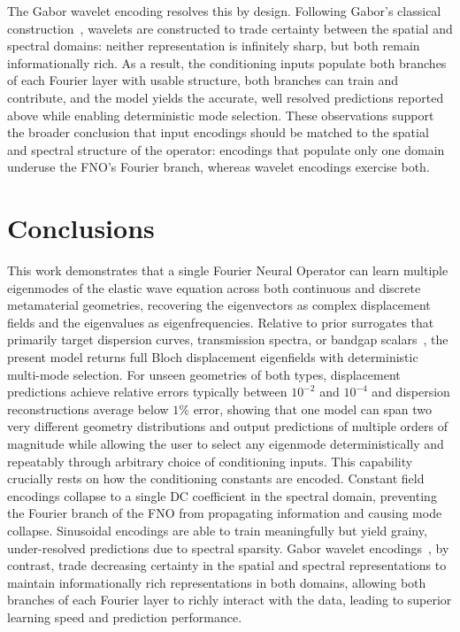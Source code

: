 \documentclass[preprint,review,12pt,numafflabel]{elsarticle}
\begin{document}
The Gabor wavelet encoding resolves this by design. Following Gabor's classical construction~\cite{gabor1946theory}, wavelets are constructed to trade certainty between the spatial and spectral domains: neither representation is infinitely sharp, but both remain informationally rich. As a result, the conditioning inputs populate both branches of each Fourier layer with usable structure, both branches can train and contribute, and the model yields the accurate, well resolved predictions reported above while enabling deterministic mode selection. These observations support the broader conclusion that input encodings should be matched to the spatial and spectral structure of the operator: encodings that populate only one domain underuse the FNO's Fourier branch, whereas wavelet encodings exercise both.


\section{Conclusions}
\label{sec:Conclusion}
This work demonstrates that a single Fourier Neural Operator can learn multiple eigenmodes of the elastic wave equation across both continuous and discrete metamaterial geometries, recovering the eigenvectors as complex displacement fields and the eigenvalues as eigenfrequencies. Relative to prior surrogates that primarily target dispersion curves, transmission spectra, or bandgap scalars~\cite{Ogren2024gpr,wagner2024neural,liu2026hybridfno}, the present model returns full Bloch displacement eigenfields with deterministic multi-mode selection. For unseen geometries of both types, displacement predictions achieve relative errors typically between $10^{-2}$ and $10^{-4}$ and dispersion reconstructions average below $1\%$ error, showing that one model can span two very different geometry distributions and output predictions of multiple orders of magnitude while allowing the user to select any eigenmode deterministically and repeatably through arbitrary choice of conditioning inputs. This capability crucially rests on how the conditioning constants are encoded. Constant field encodings collapse to a single DC coefficient in the spectral domain, preventing the Fourier branch of the FNO from propagating information and causing mode collapse. Sinusoidal encodings are able to train meaningfully but yield grainy, under-resolved predictions due to spectral sparsity. Gabor wavelet encodings~\cite{gabor1946theory}, by contrast, trade decreasing certainty in the spatial and spectral representations to maintain informationally rich representations in both domains, allowing both branches of each Fourier layer to richly interact with the data, leading to superior learning speed and prediction performance.
\end{document}
